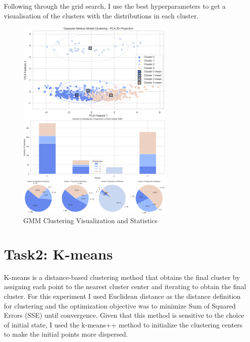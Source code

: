 \documentclass[journal]{IEEEtai}
\begin{document}
Following through the grid search, I use the best hyperparameters to get a visualisation of the clusters with the distributions in each cluster.

\begin{figure}[htbp]
	\centerline{\includegraphics[width=18.3pc]{GMM-sum2.png}}
	\caption{GMM Clustering Visualization and Statistics}
\end{figure}

\section{\textbf{Task2: K-means}}
K-means is a distance-based clustering method that obtains the final cluster by assigning each point to the nearest cluster center and iterating to obtain the final cluster. For this experiment I used Euclidean distance as the distance definition for clustering and the optimization objective was to minimize Sum of Squared Errors (SSE) until convergence. Given that this method is sensitive to the choice of initial state, I used the k-means++ method to initialize the clustering centers to make the initial points more dispersed.
\end{document}
